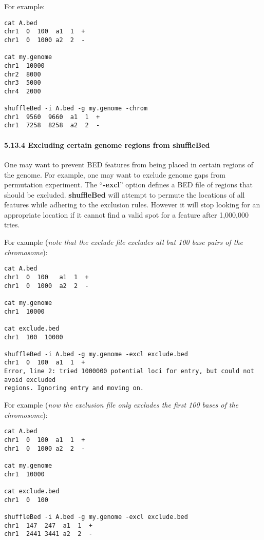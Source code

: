 \documentclass[letterpaper,10pt,english]{sphinxmanual}
\begin{document}
For example:

\begin{Verbatim}[commandchars=\\\{\}]
cat A.bed
chr1  0  100  a1  1  +
chr1  0  1000 a2  2  -

cat my.genome
chr1  10000
chr2  8000
chr3  5000
chr4  2000

shuffleBed -i A.bed -g my.genome -chrom
chr1  9560  9660  a1  1  +
chr1  7258  8258  a2  2  -
\end{Verbatim}


\paragraph{5.13.4 Excluding certain genome regions from shuffleBed}
\label{content/shuffleBed:excluding-certain-genome-regions-from-shufflebed}
One may want to prevent BED features from being placed in certain regions of the genome. For
example, one may want to exclude genome gaps from permutation experiment. The ``\textbf{-excl}'' option
defines a BED file of regions that should be excluded. \textbf{shuffleBed} will attempt to permute the
locations of all features while adhering to the exclusion rules. However it will stop looking for an
appropriate location if it cannot find a valid spot for a feature after 1,000,000 tries.

For example (\emph{note that the exclude file excludes all but 100 base pairs of the chromosome}):

\begin{Verbatim}[commandchars=\\\{\}]
cat A.bed
chr1  0  100   a1  1  +
chr1  0  1000  a2  2  -

cat my.genome
chr1  10000

cat exclude.bed
chr1  100  10000

shuffleBed -i A.bed -g my.genome -excl exclude.bed
chr1  0  100  a1  1  +
Error, line 2: tried 1000000 potential loci for entry, but could not avoid excluded
regions. Ignoring entry and moving on.
\end{Verbatim}

For example (\emph{now the exclusion file only excludes the first 100 bases of the chromosome}):

\begin{Verbatim}[commandchars=\\\{\}]
cat A.bed
chr1  0  100  a1  1  +
chr1  0  1000 a2  2  -

cat my.genome
chr1  10000

cat exclude.bed
chr1  0  100

shuffleBed -i A.bed -g my.genome -excl exclude.bed
chr1  147  247  a1  1  +
chr1  2441 3441 a2  2  -
\end{Verbatim}
\end{document}
